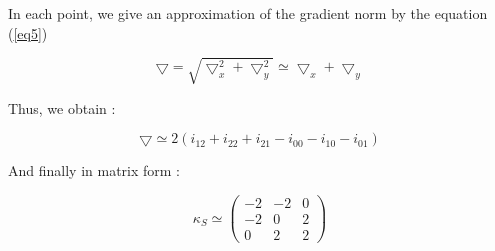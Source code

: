 \documentclass[12pt,a4paper]{article}
\begin{document}
\vspace{0.5cm}

In each point, we give an approximation of the gradient norm by the equation (\ref{eq5})

\begin{equation}\label{eq5}
\bigtriangledown = \sqrt{\bigtriangledown_x^2 + \bigtriangledown_y^2 } \simeq \bigtriangledown_x + \bigtriangledown_y
\end{equation}

\vspace{0.5cm}

Thus, we obtain :

\begin{equation}\label{eq6}
\bigtriangledown \simeq 2(i_{12}+i_{22}+i_{21}-i_{00}-i_{10}-i_{01})
\end{equation}
 
\vspace{0.25cm}
 
And finally in matrix form : 

\begin{equation}\label{eq7}
\kappa_S  \simeq \begin{pmatrix}
-2 & -2 & 0\\ 
-2 & 0 & 2\\ 
 0 & 2 & 2
\end{pmatrix}
\end{equation}
\end{document}
